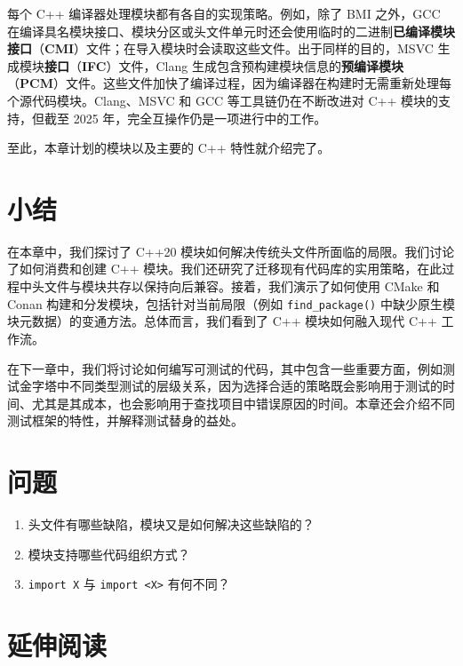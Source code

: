 \label{idx:780}
\label{idx:781}
\label{idx:782}
每个 C++ 编译器处理模块都有各自的实现策略。例如，除了 BMI 之外，GCC 在编译具名模块接口、模块分区或头文件单元时还会使用临时的二进制\textbf{已编译模块接口}（\textbf{CMI}）文件；在导入模块时会读取这些文件。出于同样的目的，MSVC 生成模块\textbf{接口}（\textbf{IFC}）文件，Clang 生成包含预构建模块信息的\textbf{预编译模块}（\textbf{PCM}）文件。这些文件加快了编译过程，因为编译器在构建时无需重新处理每个源代码模块。Clang、MSVC 和 GCC 等工具链仍在不断改进对 C++ 模块的支持，但截至 2025 年，完全互操作仍是一项进行中的工作。

至此，本章计划的模块以及主要的 C++ 特性就介绍完了。

\section{小结}

在本章中，我们探讨了 C++20 模块如何解决传统头文件所面临的局限。我们讨论了如何消费和创建 C++ 模块。我们还研究了迁移现有代码库的实用策略，在此过程中头文件与模块共存以保持向后兼容。接着，我们演示了如何使用 CMake 和 Conan 构建和分发模块，包括针对当前局限（例如 \texttt{find\_\allowbreak{}package(\allowbreak{})\allowbreak{}} 中缺少原生模块元数据）的变通方法。总体而言，我们看到了 C++ 模块如何融入现代 C++ 工作流。

在下一章中，我们将讨论如何编写可测试的代码，其中包含一些重要方面，例如测试金字塔中不同类型测试的层级关系，因为选择合适的策略既会影响用于测试的时间、尤其是其成本，也会影响用于查找项目中错误原因的时间。本章还会介绍不同测试框架的特性，并解释测试替身的益处。

\section{问题}

\begin{enumerate}
\item 头文件有哪些缺陷，模块又是如何解决这些缺陷的？
\item 模块支持哪些代码组织方式？
\item \texttt{import X} 与 \texttt{import <X>} 有何不同？
\end{enumerate}

\section{延伸阅读}

